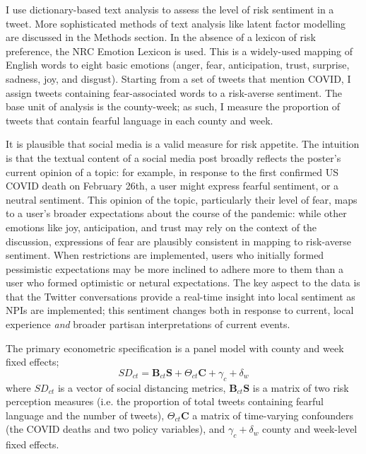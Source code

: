\documentclass{article}
\begin{document}
I use dictionary-based text analysis to assess the level of risk sentiment in a tweet. More sophisticated methods of text analysis like latent factor modelling are discussed in the Methods section. In the absence of a lexicon of risk preference, the NRC Emotion Lexicon \parencite{mohammadCrowdsourcingWordEmotion2013} is used. This is a widely-used mapping of English words to eight basic emotions (anger, fear, anticipation, trust, surprise, sadness, joy, and disgust). Starting from a set of tweets that mention COVID, I assign tweets containing fear-associated words to a risk-averse sentiment. The base unit of analysis is the county-week; as such, I measure the proportion of tweets that contain fearful language in each county and week. 

It is plausible that social media is a valid measure for risk appetite. The intuition is that the textual content of a social media post broadly reflects the poster's current opinion of a topic: for example, in response to the first confirmed US COVID death on February 26th, a user might express fearful sentiment, or a neutral sentiment. This opinion of the topic, particularly their level of fear, maps to a user's broader expectations about the course of the pandemic: while other emotions like joy, anticipation, and trust may rely on the context of the discussion, expressions of fear are plausibly consistent in mapping to risk-averse sentiment. When restrictions are implemented, users who initially formed pessimistic expectations may be more inclined to adhere more to them than a user who formed optimistic or netural expectations. The key aspect to the data is that the Twitter conversations provide a real-time insight into local sentiment as NPIs are implemented; this sentiment changes both in response to current, local experience \textit{and} broader partisan interpretations of current events.

The primary econometric specification is a panel model with county and week fixed effects;
\begin{equation}
  SD_{ct} = \mathbf{B}_{ct} \mathbf{S} + \Theta_{ct} \mathbf{C} + \gamma_c + \delta_w
\end{equation}
where \(SD_{ct}\) is a vector of social distancing metrics, \(\mathbf{B}_{ct}  \mathbf{S}\) is a matrix of two risk perception measures (i.e. the proportion of total tweets containing fearful language and the number of tweets), \(\Theta_{ct} \mathbf{C}\) a matrix of time-varying confounders (the COVID deaths and two policy variables), and \(\gamma_c + \delta_w\) county and week-level fixed effects. 
\end{document}
